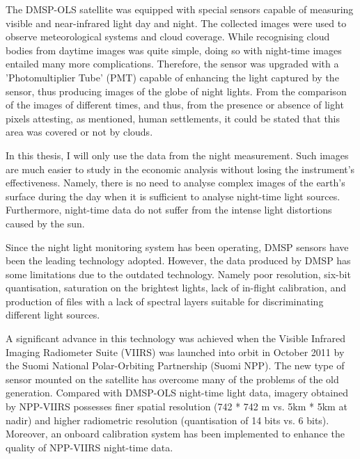 The DMSP-OLS satellite was equipped with special sensors capable of measuring visible and near-infrared light day and night. The collected images were used to observe meteorological systems and cloud coverage. 
While recognising cloud bodies from daytime images was quite simple, doing so with night-time images entailed many more complications. Therefore, the sensor was upgraded with a 'Photomultiplier Tube' (PMT) capable of enhancing the light captured by the sensor, thus producing images of the globe of night lights. From the comparison of the images of different times, and thus, from the presence or absence of light pixels attesting, as mentioned, human settlements, it could be stated that this area was covered or not by clouds.

In this thesis, I will only use the data from the night measurement. Such images are much easier to study in the economic analysis without losing the instrument's effectiveness. Namely, there is no need to analyse complex images of the earth's surface during the day when it is sufficient to analyse night-time light sources. Furthermore, night-time data do not suffer from the intense light distortions caused by the sun.

Since the night light monitoring system has been operating, DMSP sensors have been the leading technology adopted. However, the data produced by DMSP has some limitations due to the outdated technology. Namely poor resolution, six-bit quantisation, saturation on the brightest lights, lack of in-flight calibration, and production of files with a lack of spectral layers suitable for discriminating different light sources.

A significant advance in this technology was achieved when the Visible Infrared Imaging Radiometer Suite (VIIRS) was launched into orbit in October 2011 by the Suomi National Polar-Orbiting Partnership (Suomi NPP). The new type of sensor mounted on the satellite has overcome many of the problems of the old generation. Compared with DMSP-OLS night-time light data, imagery obtained by NPP-VIIRS possesses finer spatial resolution (742 * 742 m vs. 5km * 5km at nadir) and higher radiometric resolution (quantisation of 14 bits vs. 6 bits). Moreover, an onboard calibration system has been implemented to enhance the quality of NPP-VIIRS night-time data. 

